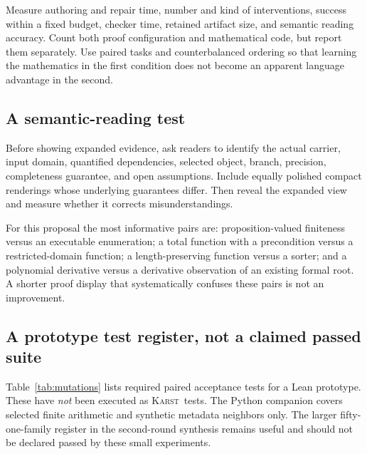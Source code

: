 \documentclass[11pt,letterpaper]{article}
\newcommand{\Karst}{\textsc{Karst}}
\theoremstyle{remark}
\begin{document}
Measure authoring and repair time, number and kind of interventions, success
within a fixed budget, checker time, retained artifact size, and semantic
reading accuracy. Count both proof configuration and mathematical code, but
report them separately. Use paired tasks and counterbalanced ordering so that
learning the mathematics in the first condition does not become an apparent
language advantage in the second.

\subsection{A semantic-reading test}
Before showing expanded evidence, ask readers to identify the actual carrier,
input domain, quantified dependencies, selected object, branch, precision,
completeness guarantee, and open assumptions. Include equally polished compact
renderings whose underlying guarantees differ. Then reveal the expanded view
and measure whether it corrects misunderstandings.

For this proposal the most informative pairs are: proposition-valued finiteness
versus an executable enumeration; a total function with a precondition versus
a restricted-domain function; a length-preserving function versus a sorter;
and a polynomial derivative versus a derivative observation of an existing
formal root. A shorter proof display that systematically confuses these pairs
is not an improvement.

\subsection{A prototype test register, not a claimed passed suite}
Table~\ref{tab:mutations} lists required paired acceptance tests for a Lean
prototype. These have \emph{not} been executed as \Karst\ tests. The Python
companion covers selected finite arithmetic and synthetic metadata neighbors
only. The larger fifty-one-family register in the second-round synthesis remains
useful and should not be declared passed by these small experiments.
\end{document}
